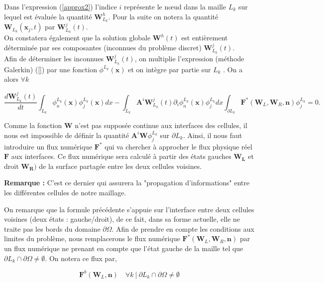 \documentclass[a4paper,oneside,10pt]{report}
\begin{document}
Dans l'expression (\ref{approx2}) l'indice $i$ représente le nœud dans la maille $L_k$ sur lequel est évaluée la quantité $\mathbf{W}^h_{L_k}$. Pour la suite on notera la quantité $\mathbf{W}_{L_k}(\mathbf{x}_j,t)$ par $\mathbf{W}_{L_k}^j(t)$.\\
On constatera également que la solution globale  $\mathbf{W}^h(t)$ est entièrement déterminée par ses composantes (inconnues du problème discret) $\mathbf{W}_{L_k}^j(t)$.\\

Afin de déterminer les inconnues $\mathbf{W}_{L_k}^j(t)$, on multiplie l'expression (méthode Galerkin) (\ref{}) par une fonction $\phi^{L_k}(\mathbf{x})$ et on intègre par partie sur $L_k$ . On a alors $\forall k$

\begin{equation}
\label{schema}
\frac{d\mathbf{W}_{L_k}^j(t)}{dt}\int_{L_k}\phi^{L_k}_n(\mathbf{x}) \phi^{L_k}_j(\mathbf{x})dx - \int_{L_k}  \mathbf{A}^i \mathbf{W}_{L_k}^j(t)\partial_i \phi^{L_k}_n(\mathbf{x}) \phi^{L_k}_j dx  \int_{\partial L_k} \mathbf{F}^*( \mathbf{W}_L,\mathbf{W}_R,\mathbf{n}) \phi^{L_k}_j= 0.
\end{equation}


Comme la fonction $\mathbf{W}$ n'est pas supposée continue aux interfaces des cellules, il nous est impossible de définir la quantité $\mathbf{A}^i \mathbf{W}\phi_j^{L_k}$ sur $\partial L_k$. Ainsi, il nous faut introduire un flux numérique $\mathbf{F}^*$ qui va chercher à approcher le flux physique réel $\mathbf{F}$ aux interfaces. Ce flux numérique sera calculé à partir des états gauches $\mathbf{W_L}$ et droit $\mathbf{W_R)}$ de la surface partagée entre les deux cellules voisines.
\newline

\textbf{Remarque :} C'est ce dernier qui assurera la "propagation d'informations" entre les différentes cellules de notre maillage.


On remarque que la formule précédente s'appuie sur l'interface entre deux cellules voisines (deux états : gauche/droit), de ce fait, dans sa forme actuelle, elle ne traite pas les bords du domaine $\partial \Omega$. Afin de prendre en compte les conditions aux limites du problème, nous remplacerons le flux numérique  $\mathbf{F}^*( \mathbf{W}_L,\mathbf{W}_R,\mathbf{n})$ par un flux numérique ne prenant en compte que l'état gauche de la maille tel que $\partial L_k \cap \partial \Omega \neq \emptyset$. On notera ce flux par,

\begin{equation}
\mathbf{F}^b( \mathbf{W}_L,\mathbf{n}) \quad \forall k\ | \ \partial L_k \cap \partial \Omega \neq \emptyset
\end{equation}
\end{document}
